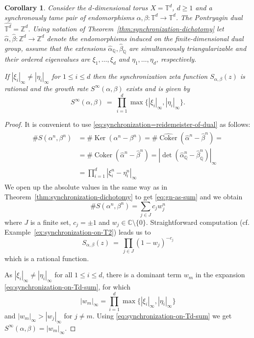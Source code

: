\documentclass[oneside]{amsart}
\def\Z{\mathbb{Z}}
\def\Q{\mathbb{Q}}
\def\C{\mathbb{C}}
\def\T{\mathbb{T}}
\def\Ker{\operatorname{Ker}}
\def\Coker{\operatorname{Coker}}
\newtheorem{col}[thm]{Corollary}
\begin{document}
\begin{col}\label{torus}
  Consider the $d$-dimensional torus $X = \T^d$, $d \geq 1$ and a synchronously tame pair of endomorphisms
  $\alpha, \beta: \T^d \to \T^d$.
  The Pontryagin dual $\widehat{\T^d} = \Z^d$.
  Using notation of {\rm Theorem~\ref{thm:synchronization-dichotomy}}
  let $\widehat{\alpha}, \widehat{\beta}: \Z^d \to \Z^d$ denote the endomorphisms induced
  on the finite-dimensional dual group, assume that the extensions
  $\widehat{\alpha}_\Q, \widehat{\beta}_\Q$ are simultaneously triangularizable
  and their ordered eigenvalues are $\xi_1, \ldots, \xi_d$ and $\eta_1, \ldots, \eta_d$, respectively.

  If $|\xi_i|_\infty \neq |\eta_i|_\infty$ for $1 \leq i \leq d$ then the synchronization zeta function
  $S_{\alpha, \beta}(z)$ is rational and the growth rate $S^\infty(\alpha, \beta)$ exists and is given by
  \begin{equation*}
    S^\infty(\alpha, \beta) \ = \ \prod_{i=1}^d \max \{ |\xi_i|_\infty, |\eta_i|_\infty \}.
  \end{equation*}
\end{col}
\begin{proof}
  It is convenient to use \eqref{eq:synchronization=reidemeister-of-dual} as follows:
  \begin{align*}
  \begin{split}
    \# S(\alpha^n, \beta^n) &= \# \Ker(\alpha^n - \beta^n)
    = \# \widehat{\Coker}(\widehat{\alpha}^n - \widehat{\beta}^n) = \\
    &= \# \Coker(\widehat{\alpha}^n - \widehat{\beta}^n)
    = \left| \det \left( \widehat{\alpha}_\Q^n - \widehat{\beta}_\Q^n \right) \right|_\infty \\
    &= \prod_{i=1}^d | \xi_i^n - \eta_i^n |_\infty
  \end{split}
  \end{align*}
  We open up the absolute values in the same way as in Theorem~\ref{thm:synchronization-dichotomy}
  to get \eqref{eq:gn-as-sum} and we obtain
  \begin{equation} \label{eq:synchronization-on-Td-sum}
    \# S(\alpha^n, \beta^n) = \sum_{j \in J} c_j w_j^n
  \end{equation}
  where $J$ is a finite set, $c_j = \pm 1$ and $w_j \in \C \setminus \{0\}$.
  Straightforward computation (cf. Example~\ref{ex:synchronization-on-T2}) leads us to
  \begin{equation*}
    S_{\alpha, \beta}(z) \ = \ \prod_{j \in J} (1 - w_j)^{-c_j}
  \end{equation*}
  which is a rational function.

  As $|\xi_i|_\infty \neq |\eta_i|_\infty$ for all $1 \leq i \leq d$, there is a dominant term $w_m$
  in the expansion \eqref{eq:synchronization-on-Td-sum}, for which
  \begin{equation*}
    |w_m|_\infty = \prod_{i=1}^d \max \{ |\xi_i|_\infty, |\eta_i|_\infty \}
  \end{equation*}
  and $|w_m|_\infty > |w_j|_\infty$ for $j \neq m$.
  Using \eqref{eq:synchronization-on-Td-sum} we get $S^\infty(\alpha, \beta) = |w_m|_\infty$.
\end{proof}
\end{document}
